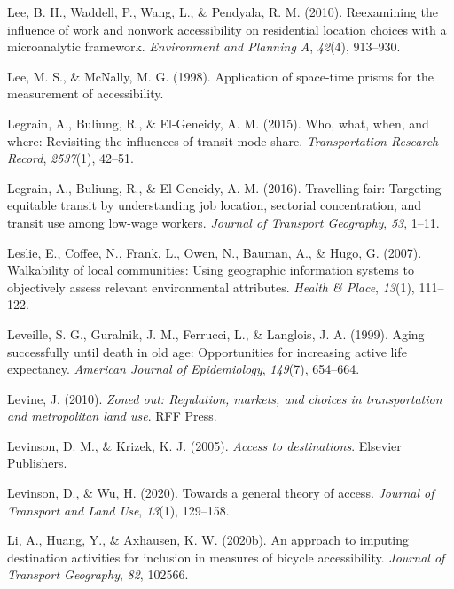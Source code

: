 \documentclass[
11pt, %
oneside, %
english, %
singlespacing, %
]{macthesis} %
\newlength{\cslhangindent}
\newenvironment{CSLReferences}[2] %
 {%
  \setlength{\parindent}{0pt}
  \ifodd #1 \everypar{\setlength{\hangindent}{\cslhangindent}}\ignorespaces\fi
  \ifnum #2 > 0
  \setlength{\parskip}{#2\baselineskip}
  \fi
 }%
 {}
\begin{document}
\begin{CSLReferences}{1}{0}
Lee, B. H., Waddell, P., Wang, L., \& Pendyala, R. M. (2010). Reexamining the influence of work and nonwork accessibility on residential location choices with a microanalytic framework. \emph{Environment and Planning A}, \emph{42}(4), 913--930.

Lee, M. S., \& McNally, M. G. (1998). Application of space-time prisms for the measurement of accessibility.

Legrain, A., Buliung, R., \& El-Geneidy, A. M. (2015). Who, what, when, and where: Revisiting the influences of transit mode share. \emph{Transportation Research Record}, \emph{2537}(1), 42--51.

Legrain, A., Buliung, R., \& El-Geneidy, A. M. (2016). Travelling fair: Targeting equitable transit by understanding job location, sectorial concentration, and transit use among low-wage workers. \emph{Journal of Transport Geography}, \emph{53}, 1--11.

Leslie, E., Coffee, N., Frank, L., Owen, N., Bauman, A., \& Hugo, G. (2007). Walkability of local communities: Using geographic information systems to objectively assess relevant environmental attributes. \emph{Health \& Place}, \emph{13}(1), 111--122.

Leveille, S. G., Guralnik, J. M., Ferrucci, L., \& Langlois, J. A. (1999). Aging successfully until death in old age: Opportunities for increasing active life expectancy. \emph{American Journal of Epidemiology}, \emph{149}(7), 654--664.

Levine, J. (2010). \emph{Zoned out: Regulation, markets, and choices in transportation and metropolitan land use}. RFF Press.

Levinson, D. M., \& Krizek, K. J. (2005). \emph{Access to destinations}. Elsevier Publishers.

Levinson, D., \& Wu, H. (2020). Towards a general theory of access. \emph{Journal of Transport and Land Use}, \emph{13}(1), 129--158.

Li, A., Huang, Y., \& Axhausen, K. W. (2020b). An approach to imputing destination activities for inclusion in measures of bicycle accessibility. \emph{Journal of Transport Geography}, \emph{82}, 102566.


\end{CSLReferences}
\end{document}
